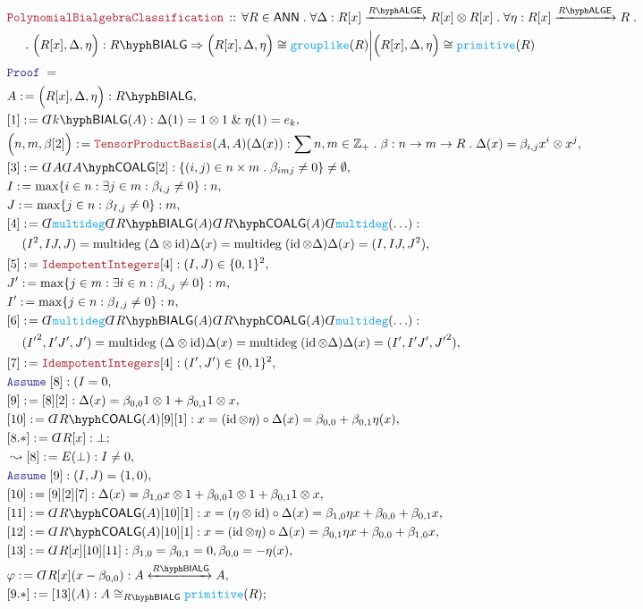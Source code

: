 \documentclass[12pt]{scrartcl}%
\newcommand{\FUNC}[1]{\textcolor{Cerulean}{\mathtt{#1}}}%
\newcommand{\LOGIC}[1]{\textcolor{Blue}{\mathtt{#1}}}%
\newcommand{\THM}[1]{\textcolor{Maroon}{\mathtt{#1}}}%
\renewcommand{\.}{\; . \;} %
\newcommand{\de}{: \kern 0.1pc =} %
\newcommand{\Theorem}[2]{& \THM{#1} \, :: \, #2 \\ & \Proof = \\ } %
\newcommand{\NewLine}{\\ & \kern 1pc}%
\newcommand{\Page}[1]{ \begin{align*} #1 \end{align*}  }%
\newcommand{ \bd }{ \ByDef }%
\renewcommand{\And}{\; \& \;}%
\newcommand{\Int}{\mathbb{Z}}%
\DeclareMathOperator*{\id}{id}%
\newcommand{\Say}[3]{& #1 \de #2 : #3, \\} %
\newcommand{\Conclude}[3]{& #1 \de #2 : #3; \\}%
\newcommand{\Derive}[3]{& \leadsto #1 \de #2 : #3, \\} %
\newcommand{\Assume}[2]{& \LOGIC{Assume} \; #1 : #2, \\} %
\newcommand{\ByDef}{\rotatebox[origin=c]{-180}{$D$}}%
\newcommand{\Proof}{\LOGIC{Proof} \; } %
\newcommand{\Arrow}[1]{\xrightarrow{#1}}%
\newcommand{\ToIso}[1]{\xleftrightarrow{#1}}%
\newcommand{\ANN}{\mathsf{ANN}} %
\newcommand{\LALGE}[1]{#1\hyph\mathsf{ALGE}}%
\newcommand{\COALG}[1]{#1\hyph\mathsf{COALG}}%
\newcommand{\BIALG}[1]{#1\hyph\mathsf{BIALG}}%
\begin{document}
\Page{
	\Theorem{PolynomialBialgebraClassification}
	{
		\forall R \in \ANN \. 
		\forall \Delta : R[x] \Arrow{\LALGE{R}} R[x] \otimes R[x] \.
		\forall \eta : R[x] \Arrow{\LALGE{R}} R \.\NewLine \.
		\Big( R[x],\Delta,\eta \Big) : \BIALG{R} \Rightarrow
		\Big(R[x],\Delta,\eta\Big) \cong \FUNC{grouplike}(R) \bigg|
		\Big(R[x],\Delta,\eta\Big) \cong \FUNC{primitive}(R)
	}
	\Say{A}{\Big(R[x],\Delta,\eta\Big)}{ \BIALG{R}  }
	\Say{[1]}{\bd \BIALG{k}(A)}{ \Delta(1) = 1 \otimes 1 \And \eta(1) = e_k }
	\Say{\Big( n,m, \beta [2] \Big)}
	{
		\THM{TensorProductBasis}(A,A)(\Delta(x))
	}
	{
		\sum n,m \in \Int_+ \.
		\beta : n \to m \to R \.
		\Delta(x) = \beta_{i,j} x^i \otimes x^j
	}
	\Say{[3]}{\bd A\bd \COALG{A}[2]}{ \{ (i,j) \in n \times m \. \beta_{imj} \neq 0  \} \neq \emptyset }
	\Say{ I}{ \max \{ i \in n : \exists j \in m : \beta_{i,j} \neq 0\}   }{n}
	\Say{ J}{ \max \{ j \in n :  \beta_{I,j} \neq 0\}   }{m}
	\Say{[4]}{\bd \FUNC{multideg}\bd \BIALG{R}(A)\bd \COALG{R}(A)\bd \FUNC{multideg}(\ldots)}
	{
		\NewLine
		(I^2,IJ,J) =
		\mathrm{multideg} \; (\Delta \otimes \id)\Delta(x) =
		\mathrm{multideg} \;(\id \otimes \Delta)\Delta(x) = (I, IJ, J^2)  }
	\Say{[5]}{\THM{IdempotentIntegers}[4]}{ (I,J) \in \{0,1\}^2  }
	\Say{ J'}{ \max \{ j \in m : \exists i \in n : \beta_{i,j} \neq 0\}   }{m}
	\Say{ I'}{ \max \{ j \in n :  \beta_{I,j} \neq 0\}   }{n}
	\Say{[6]}{\bd \FUNC{multideg}\bd \BIALG{R}(A)\bd \COALG{R}(A)\bd \FUNC{multideg}(\ldots)}
	{
		\NewLine
		({I'}^2,I'J',J') =
		\mathrm{multideg} \; (\Delta \otimes \id)\Delta(x) =
		\mathrm{multideg} \;(\id \otimes \Delta)\Delta(x) = (I', I'J', {J'}^2)  }
	\Say{[7]}{\THM{IdempotentIntegers}[4]}{ (I',J') \in \{0,1\}^2  }
	\Assume{[8]}{(I = 0}
	\Say{[9]}{[8][2]}{ \Delta(x) = \beta_{0,0} 1 \otimes 1 + \beta_{0,1} 1 \otimes x  }
	\Say{[10]}{\bd \COALG{R}(A)[9][1]}{ x = (\id \otimes \eta) \circ \Delta(x) = \beta_{0,0} + \beta_{0,1}\eta(x) }
	\Conclude{[8.*]}{\bd R[x]}{\bot}
	\Derive{[8]}{E(\bot)}{ I \neq 0}
	\Assume{[9]}{(I,J) = (1,0)}
	\Say{[10]}{[9][2][7]}{ \Delta(x) = \beta_{1,0} x \otimes 1 + \beta_{0,0} 1 \otimes 1 + \beta_{0,1} 1 \otimes x}
	\Say{[11]}{\bd \COALG{R}(A)[10][1]}{ 
		x = 
		(\eta \otimes \id)\circ \Delta(x) = 
		\beta_{1,0} \eta{x} + \beta_{0,0} + \beta_{0,1}x 
	}
	\Say{[12]}{\bd \COALG{R}(A)[10][1]}{ 
		x = 
		(\id \otimes \eta)\circ \Delta(x) = 
		\beta_{0,1} \eta{x} + \beta_{0,0} + \beta_{1,0}x 
	}
	\Say{[13]}{\bd R[x][10][11]}{\beta_{1,0} = \beta_{0,1} = 0, \beta_{0,0} = -\eta(x)}
	\Say{\varphi}{\bd R[x] (x - \beta_{0,0})}{ A \ToIso{\BIALG{R}} A }
	\Conclude{[9.*]}{[13](A)}{ A \cong_{\BIALG{R}} \FUNC{primitive}(R) }
}
\end{document}
